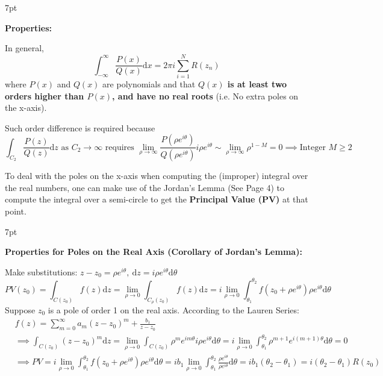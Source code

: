 \documentclass[10pt]{article}
\newcommand{\dd}{\mathrm{d}}
\newenvironment{formal}[2]{%
	\def\FrameCommand{%
		\hspace{1pt}%
		{\color{#1}\vrule width 2pt}%
		{\color{#2}\vrule width 4pt}%
		\colorbox{#2}%
	}%
	\MakeFramed{\advance\hsize-\width\FrameRestore}%
	\noindent\hspace{-4.55pt}%
	\begin{adjustwidth}{}{7pt}%
		\vspace{2pt}\vspace{2pt}%
	}
	{%
		\vspace{2pt}\end{adjustwidth}\endMakeFramed%
}
\begin{document}
\begin{formal}{Blue}{blueshade}
	\textbf{Properties:}
	
	In general,
	\[
	\int_{-\infty}^{\infty} \frac{P(x)}{Q(x)} \dd x = 2 \pi i \sum_{i=1}^N R(z_n)
	\]
	where $P(x)$ and $Q(x)$ are polynomials and that \textbf{$Q(x)$ is at least two orders higher than $P(x)$, and have no real roots} (i.e. No extra poles on the x-axis).
	
	Such order difference is required because
	\[
	\int_{C_2} \frac{P(z)}{Q(z)} \dd z \text{ as $C_2 \to \infty$ requires } \lim_{\rho\to\infty} \frac{P(\rho e^{i\theta})}{Q(\rho e^{i\theta})} i\rho e^{i\theta} \sim \lim_{\rho\to\infty} \rho^{1-M} = 0 \implies \text{Integer }M \geq 2
	\]
\end{formal}

To deal with the poles on the x-axis when computing the (improper) integral over the real numbers, one can make use of the Jordan's Lemma (See Page 4) to compute the integral over a semi-circle to get the \textbf{Principal Value (PV)} at that point.

\begin{formal}{Blue}{blueshade}
	
	\textbf{Properties for Poles on the Real Axis (Corollary of Jordan's Lemma):}
	
	\noindent Make substitutions: $z-z_0 = \rho e^{i\theta},\ \dd z = i\rho e^{i\theta} \dd \theta$
	\[
	PV(z_0) = \int_{C(z_0)} f(z) \dd z = \lim_{\rho\to 0} \int_{C_\rho(z_0)} f(z) \dd z = i \lim_{\rho\to 0} \int_{\theta_1}^{\theta_2} f(z_0+\rho e^{i\theta}) \rho e^{i\theta} \dd \theta
	\]
	Suppose $z_0$ is a pole of order 1 on the real axis. According to the Lauren Series:
	\[
	\begin{aligned}
		&f(z) = \sum_{m=0}^\infty a_m (z-z_0)^m + \frac{b_1}{z-z_0}\\
		&\implies \int_{C(z_0)} (z-z_0)^m \dd z = \lim_{\rho\to 0} \int_{C(z_0)} \rho^m e^{im\theta} i\rho e^{i\theta} \dd \theta = i \lim_{\rho\to 0} \int_{\theta_1}^{\theta_2} \rho^{m+1} e^{i(m+1)\theta} \dd \theta = 0\\
		&\implies PV = i \lim_{\rho\to 0} \int_{\theta_1}^{\theta_2} f(z_0 + \rho e^{i\theta}) \rho e^{i\theta} \dd \theta = ib_1 \lim_{\rho\to 0} \int_{\theta_1}^{\theta_2} \frac{\rho e^{i\theta}}{\rho e^{i\theta}} \dd \theta = ib_1 (\theta_2 - \theta_1) = i(\theta_2-\theta_1) R(z_0)
	\end{aligned}
	\]
	
\end{formal}
\end{document}

